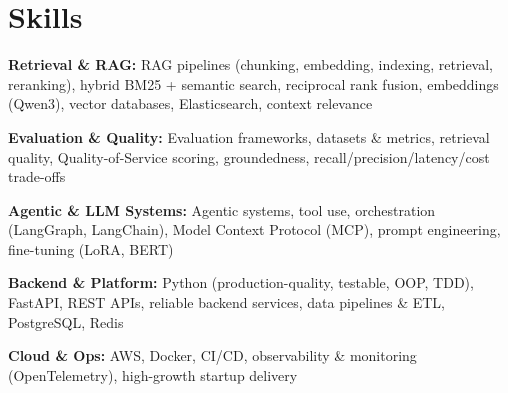 \documentclass[10pt,a4paper]{article}
\begin{document}
\section{Skills}
\begin{tight}
  \item[\textcolor{accent}{\small$\bullet$}] \textbf{Retrieval \& RAG:} RAG pipelines (chunking, embedding, indexing, retrieval, reranking), hybrid BM25 + semantic search, reciprocal rank fusion, embeddings (Qwen3), vector databases, Elasticsearch, context relevance
  \item[\textcolor{accent}{\small$\bullet$}] \textbf{Evaluation \& Quality:} Evaluation frameworks, datasets \& metrics, retrieval quality, Quality-of-Service scoring, groundedness, recall/precision/latency/cost trade-offs
  \item[\textcolor{accent}{\small$\bullet$}] \textbf{Agentic \& LLM Systems:} Agentic systems, tool use, orchestration (LangGraph, LangChain), Model Context Protocol (MCP), prompt engineering, fine-tuning (LoRA, BERT)
  \item[\textcolor{accent}{\small$\bullet$}] \textbf{Backend \& Platform:} Python (production-quality, testable, OOP, TDD), FastAPI, REST APIs, reliable backend services, data pipelines \& ETL, PostgreSQL, Redis
  \item[\textcolor{accent}{\small$\bullet$}] \textbf{Cloud \& Ops:} AWS, Docker, CI/CD, observability \& monitoring (OpenTelemetry), high-growth startup delivery
\end{tight}

\end{document}
